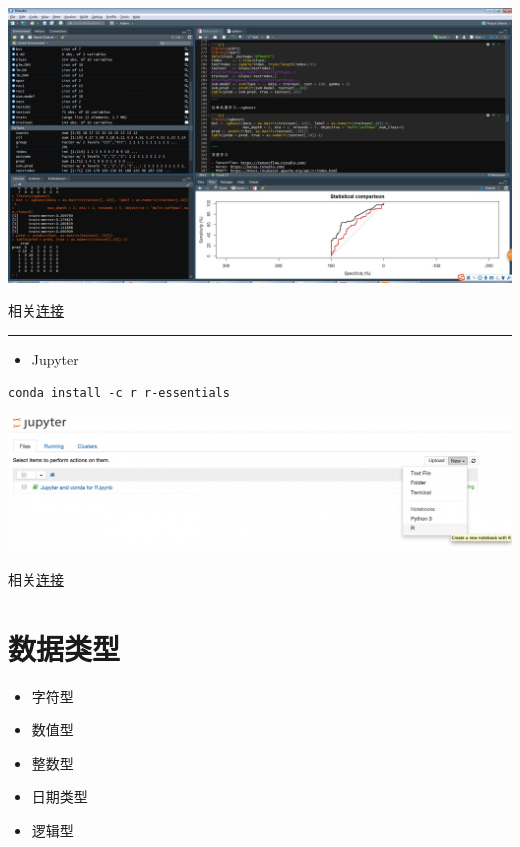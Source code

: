 \documentclass[]{book}
\providecommand{\tightlist}{%
  \setlength{\itemsep}{0pt}\setlength{\parskip}{0pt}}
\begin{document}
\includegraphics{figures/rstudio.jpg}

相关\href{https://www.rstudio.com/products/RStudio/}{连接}

\begin{center}\rule{0.5\linewidth}{\linethickness}\end{center}

\begin{itemize}
\tightlist
\item
  Jupyter
\end{itemize}

\begin{verbatim}
conda install -c r r-essentials
\end{verbatim}

\includegraphics{figures/jupyter.png}

相关\href{https://www.anaconda.com/developer-blog/jupyter-and-conda-r/}{连接}

\hypertarget{section-3}{%
\section{数据类型}\label{section-3}}

\begin{itemize}
\tightlist
\item
  字符型
\item
  数值型
\item
  整数型
\item
  日期类型
\item
  逻辑型
\end{itemize}
\end{document}
